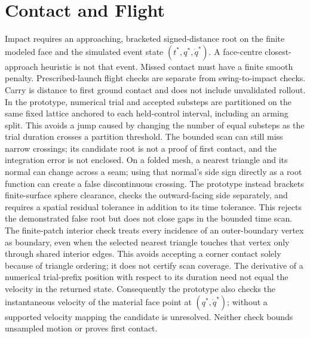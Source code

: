\documentclass{article}
\begin{document}
\section{Contact and Flight}
Impact requires an approaching, bracketed signed-distance root on the finite
modeled face and the simulated event state $(t^*,q^*,\dot q^*)$. A face-centre
closest-approach heuristic is not that event. Missed contact must have a
finite smooth penalty. Prescribed-launch flight checks are separate from
swing-to-impact checks. Carry is distance to first ground contact and does not
include unvalidated rollout.
In the prototype, numerical trial and accepted substeps are partitioned on
the same fixed lattice anchored to each held-control interval, including an
arming split. This avoids a jump caused by changing the number of equal
substeps as the trial duration crosses a partition threshold. The bounded
scan can still miss narrow crossings; its candidate root is not a proof of
first contact, and the integration error is not enclosed.
On a folded mesh, a nearest triangle and its normal can change across a seam;
using that normal's side sign directly as a root function can create a false
discontinuous crossing. The prototype instead brackets finite-surface sphere
clearance, checks the outward-facing side separately, and requires a spatial
residual tolerance in addition to its time tolerance. This rejects the
demonstrated false root but does not close gaps in the bounded time scan.
The finite-patch interior check treats every incidence of an outer-boundary
vertex as boundary, even when the selected nearest triangle touches that
vertex only through shared interior edges. This avoids accepting a corner
contact solely because of triangle ordering; it does not certify scan coverage.
The derivative of a numerical trial-prefix position with respect to its
duration need not equal the velocity in the returned state. Consequently the
prototype also checks the instantaneous velocity of the material face point
at $(q^*,\dot q^*)$; without a supported velocity mapping the candidate is
unresolved. Neither check bounds unsampled motion or proves first contact.
\end{document}
